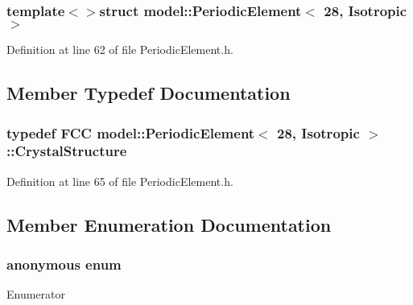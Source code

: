 \subsubsection*{template$<$$>$struct model\+::\+Periodic\+Element$<$ 28, Isotropic $>$}



Definition at line 62 of file Periodic\+Element.\+h.



\subsection{Member Typedef Documentation}
\hypertarget{structmodel_1_1_periodic_element_3_0128_00_01_isotropic_01_4_af4d718e2f161df603099c24b762944b9}{}
\subsubsection[{Crystal\+Structure}]{\setlength{\rightskip}{0pt plus 5cm}typedef {\bf F\+C\+C} {\bf model\+::\+Periodic\+Element}$<$ 28, {\bf Isotropic} $>$\+::{\bf Crystal\+Structure}}\label{structmodel_1_1_periodic_element_3_0128_00_01_isotropic_01_4_af4d718e2f161df603099c24b762944b9}


Definition at line 65 of file Periodic\+Element.\+h.



\subsection{Member Enumeration Documentation}
\hypertarget{structmodel_1_1_periodic_element_3_0128_00_01_isotropic_01_4_af4f4464de50c3d753543912da4365bbc}{}\subsubsection[{anonymous enum}]{\setlength{\rightskip}{0pt plus 5cm}anonymous enum}\label{structmodel_1_1_periodic_element_3_0128_00_01_isotropic_01_4_af4f4464de50c3d753543912da4365bbc}
\begin{Desc}
\item[Enumerator]\par
\begin{description}
\item[{\em 
\hypertarget{structmodel_1_1_periodic_element_3_0128_00_01_isotropic_01_4_af4f4464de50c3d753543912da4365bbca6c89fa49cf1841478038f471c626f34e}{}Z\label{structmodel_1_1_periodic_element_3_0128_00_01_isotropic_01_4_af4f4464de50c3d753543912da4365bbca6c89fa49cf1841478038f471c626f34e}
}]\end{description}
\end{Desc}


